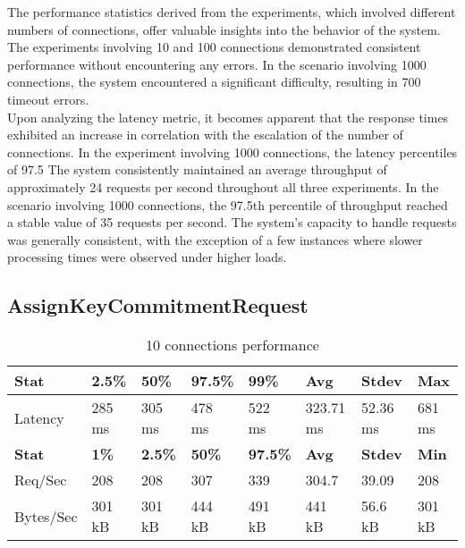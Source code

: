 \documentclass[../Main.tex]{subfiles}
\begin{document}
The performance statistics derived from the experiments, which involved different numbers of connections, offer valuable insights into the behavior of the system. The experiments involving 10 and 100 connections demonstrated consistent performance without encountering any errors. In the scenario involving 1000 connections, the system encountered a significant difficulty, resulting in 700 timeout errors.\\
Upon analyzing the latency metric, it becomes apparent that the response times exhibited an increase in correlation with the escalation of the number of connections. In the experiment involving 1000 connections, the latency percentiles of 97.5%
The system consistently maintained an average throughput of approximately 24 requests per second throughout all three experiments. In the scenario involving 1000 connections, the 97.5th percentile of throughput reached a stable value of 35 requests per second. The system's capacity to handle requests was generally consistent, with the exception of a few instances where slower processing times were observed under higher loads.\\

\subsection{AssignKeyCommitmentRequest}

\begin{table}[H]
  \centering
\begin{tabular}{|l|l|l|l|l|l|l|l|}
\hline
\rowcolor[HTML]{f56b00}
\textbf{Stat} & \textbf{2.5\%} & \textbf{50\%} & \textbf{97.5\%} & \textbf{99\%} & \textbf{Avg} & \textbf{Stdev} & \textbf{Max} \\
\hline
Latency & 285 ms & 305 ms & 478 ms & 522 ms & 323.71 ms & 52.36 ms & 681 ms \\
\hline
\rowcolor[HTML]{f56b00}
\textbf{Stat} & \textbf{1\%} & \textbf{2.5\%} & \textbf{50\%} & \textbf{97.5\%} & \textbf{Avg} & \textbf{Stdev} & \textbf{Min} \\
\hline
Req/Sec & 208 & 208 & 307 & 339 & 304.7 & 39.09 & 208 \\
Bytes/Sec & 301 kB & 301 kB & 444 kB & 491 kB & 441 kB & 56.6 kB & 301 kB \\
\hline
\end{tabular}
 \caption{10 connections performance}
 \label{10-connections-performance}
\end{table}
\end{document}
